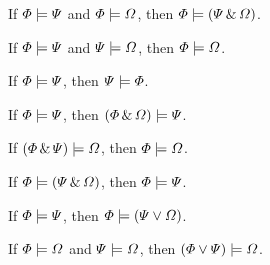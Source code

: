 \begin{earg}
\item If $\varPhi{} \models \varPsi{}$ and $\varPhi{} \models \varOmega{}$, then $\varPhi{} \models (\varPsi{} \,\&\, \varOmega{})$.
\item If $\varPhi{} \models \varPsi{}$ and $\varPsi{} \models \varOmega{}$, then $\varPhi{} \models \varOmega{}$.
\item If $\varPhi{} \models \varPsi{}$, then $\varPsi{} \models \varPhi{}$.
\item If $\varPhi{} \models \varPsi{}$, then $(\varPhi{} \,\&\, \varOmega{}) \models \varPsi{}$.
\item If $(\varPhi{} \,\&\, \varPsi{}) \models \varOmega{}$, then $\varPhi{} \models \varOmega{}$.
\item If $\varPhi{} \models (\varPsi{} \,\&\, \varOmega{})$, then $\varPhi{} \models \varPsi{}$.
\item If $\varPhi{} \models \varPsi{}$, then $\varPhi{} \models (\varPsi{} \vee \varOmega{})$.
\item If $\varPhi{} \models \varOmega{}$ and $\varPsi{} \models \varOmega{}$, then $(\varPhi{} \vee \varPsi{}) \models \varOmega{}$.
\end{earg}

